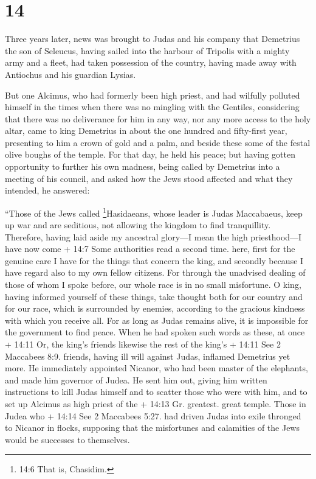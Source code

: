 \hypertarget{section-13}{%
\section{14}\label{section-13}}

 Three years later, news was brought to Judas and his
company that Demetrius the son of Seleucus, having sailed into the
harbour of Tripolis with a mighty army and a fleet,  had
taken possession of the country, having made away with Antiochus and his
guardian Lysias.

 But one Alcimus, who had formerly been high priest, and had
wilfully polluted himself in the times when there was no mingling with
the Gentiles, considering that there was no deliverance for him in any
way, nor any more access to the holy altar,  came to king
Demetrius in about the one hundred and fifty-first year, presenting to
him a crown of gold and a palm, and beside these some of the festal
olive boughs of the temple. For that day, he held his peace;
 but having gotten opportunity to further his own madness,
being called by Demetrius into a meeting of his council, and asked how
the Jews stood affected and what they intended, he answered:

 ``Those of the Jews called \footnote{14:6 That is,
  Chasidim.}Hasidaeans, whose leader is Judas Maccabaeus, keep up war
and are seditious, not allowing the kingdom to find tranquillity.
 Therefore, having laid aside my ancestral glory---I mean
the high priesthood---I have now come + 14:7 Some authorities read a
second time. here,  first for the genuine care I have for
the things that concern the king, and secondly because I have regard
also to my own fellow citizens. For through the unadvised dealing of
those of whom I spoke before, our whole race is in no small misfortune.
 O king, having informed yourself of these things, take
thought both for our country and for our race, which is surrounded by
enemies, according to the gracious kindness with which you receive all.
 For as long as Judas remains alive, it is impossible for
the government to find peace.  When he had spoken such
words as these, at once + 14:11 Or, the king's friends likewise the rest
of the king's + 14:11 See 2 Maccabees 8:9. friends, having ill will
against Judas, inflamed Demetrius yet more.  He immediately
appointed Nicanor, who had been master of the elephants, and made him
governor of Judea. He sent him out,  giving him written
instructions to kill Judas himself and to scatter those who were with
him, and to set up Alcimus as high priest of the + 14:13 Gr. greatest.
great temple.  Those in Judea who + 14:14 See 2 Maccabees
5:27. had driven Judas into exile thronged to Nicanor in flocks,
supposing that the misfortunes and calamities of the Jews would be
successes to themselves.

